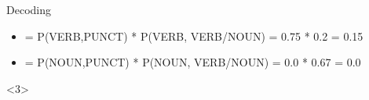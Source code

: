 \documentclass{beamer}
\begin{document}
\begin{frame}{Decoding}
\begin{center}
\begin{onlyenv}

{\small
\begin{itemize}
  \item = P(VERB,PUNCT) * P(VERB, VERB/NOUN) = 0.75 * 0.2 = 0.15
  \item = P(NOUN,PUNCT) * P(NOUN, VERB/NOUN) = 0.0 * 0.67 = 0.0
\end{itemize}
}

\end{onlyenv}



\begin{onlyenv}<3>


\end{onlyenv}
\end{center}
\end{frame}
\end{document}
